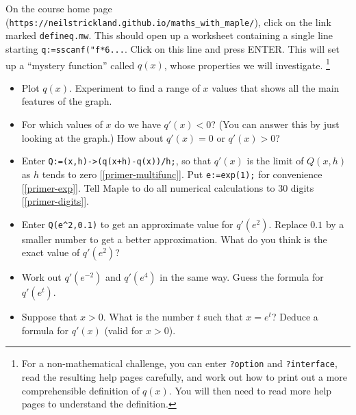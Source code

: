 \documentclass[a4paper,10pt]{amsbook}
\begin{document}
\begin{exercise}\label{ex-Li}
 On the course home page
 (\verb~https://neilstrickland.github.io/maths_with_maple/~), click on
 the link marked \verb~defineq.mw~.  This should open up a worksheet 
 containing a single line starting
 \verb~q:=sscanf("f*6...~.  Click on this line and press
 ENTER.  This will set up a ``mystery function'' called
 $q(x)$, whose properties we will investigate. 
 \footnote{For a non-mathematical challenge, you can enter
  \verb~?option~ and \verb~?interface~, read the resulting help pages
  carefully, and work out how to print out a more
  comprehensible definition of $q(x)$.  You will then need
  to read more help pages to understand the definition. 
 }
 \begin{itemize}
  \item[(a)] Plot $q(x)$.  Experiment to find a range of $x$ values
   that shows all the main features of the graph. 
  \item[(b)] For which values of $x$ do we have $q'(x)<0$?  (You can
   answer this by just looking at the graph.)  How about $q'(x)=0$ or
   $q'(x)>0$? 
  \item[(c)] Enter \verb~Q:=(x,h)->(q(x+h)-q(x))/h;~, so that $q'(x)$
   is the limit of $Q(x,h)$ as $h$ tends to zero
   [\ref{primer-multifunc}].  Put \verb~e:=exp(1);~ for
   convenience [\ref{primer-exp}].  Tell Maple to do all numerical
   calculations to 30 digits [\ref{primer-digits}]. 
  \item[(d)] Enter \verb~Q(e^2,0.1)~ to get an approximate value for
   $q'(e^2)$.  Replace $0.1$ by a smaller number to get a better
   approximation.  What do you think is the exact value of $q'(e^2)$? 
  \item[(e)] Work out $q'(e^{-2})$ and $q'(e^4)$ in the same way. 
   Guess the formula for $q'(e^t)$. 
  \item[(f)] Suppose that $x>0$.  What is the number $t$
   such that $x=e^t$?  Deduce a formula for $q'(x)$ (valid for $x>0$). 
 \end{itemize}
\end{exercise}
\end{document}
